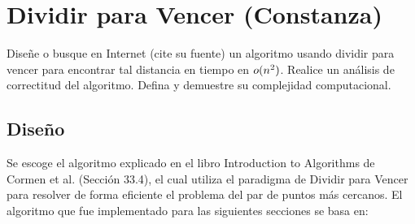 \documentclass[informe.tex]{subfiles}
\begin{document}
\section{Dividir para Vencer (Constanza)}

Diseñe o busque en Internet (cite su fuente) un algoritmo  usando
dividir para vencer para encontrar tal distancia en tiempo en $o(n^2)$. Realice un análisis
de correctitud del algoritmo. Defina y demuestre su complejidad computacional.


\subsection{Diseño}

Se escoge el algoritmo explicado en el libro Introduction to Algorithms de Cormen et al.
(Sección 33.4), el cual utiliza el paradigma de Dividir para Vencer para resolver de forma eficiente
el problema del par de puntos más cercanos. El algoritmo que fue implementado para las
siguientes secciones se basa en:
\end{document}
